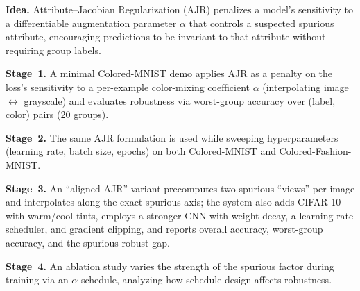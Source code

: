 \begin{appendices}
\textbf{Idea.} Attribute–Jacobian Regularization (AJR) penalizes a model's sensitivity to a differentiable augmentation parameter $\alpha$ that controls a suspected spurious attribute, encouraging predictions to be invariant to that attribute without requiring group labels.

\textbf{Stage~1.} A minimal Colored-MNIST demo applies AJR as a penalty on the loss's sensitivity to a per-example color-mixing coefficient $\alpha$ (interpolating image $\leftrightarrow$ grayscale) and evaluates robustness via worst-group accuracy over (label, color) pairs (20 groups).

\textbf{Stage~2.} The same AJR formulation is used while sweeping hyperparameters (learning rate, batch size, epochs) on both Colored-MNIST and Colored-Fashion-MNIST.

\textbf{Stage~3.} An ``aligned AJR'' variant precomputes two spurious ``views'' per image and interpolates along the exact spurious axis; the system also adds CIFAR-10 with warm/cool tints, employs a stronger CNN with weight decay, a learning-rate scheduler, and gradient clipping, and reports overall accuracy, worst-group accuracy, and the spurious-robust gap.

\textbf{Stage~4.} An ablation study varies the strength of the spurious factor during training via an $\alpha$-schedule, analyzing how schedule design affects robustness.



\end{appendices}
